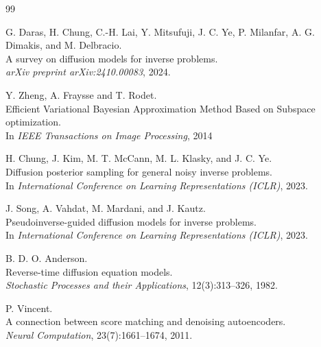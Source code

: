 \documentclass[12pt]{article}
\begin{document}
\newpage

\begin{thebibliography}{99}

G. Daras, H. Chung, C.-H. Lai, Y. Mitsufuji, J. C. Ye, P. Milanfar, A. G. Dimakis, and M. Delbracio.\\
\newblock A survey on diffusion models for inverse problems.\\
\newblock \textit{arXiv preprint arXiv:2410.00083}, 2024.

Y. Zheng, A. Fraysse and T. Rodet.\\
\newblock Efficient Variational Bayesian Approximation Method
Based on Subspace optimization.\\
\newblock In \textit{IEEE Transactions on Image Processing}, 2014

H. Chung, J. Kim, M. T. McCann, M. L. Klasky, and J. C. Ye.\\
\newblock Diffusion posterior sampling for general noisy inverse problems.\\
\newblock In \textit{International Conference on Learning Representations (ICLR)}, 2023.



J. Song, A. Vahdat, M. Mardani, and J. Kautz.\\
\newblock Pseudoinverse-guided diffusion models for inverse problems.\\
\newblock In \textit{International Conference on Learning Representations (ICLR)}, 2023.

B. D. O. Anderson.\\
\newblock Reverse-time diffusion equation models.\\
\newblock \textit{Stochastic Processes and their Applications}, 12(3):313--326, 1982.

P. Vincent.\\
\newblock A connection between score matching and denoising autoencoders.\\
\newblock \textit{Neural Computation}, 23(7):1661--1674, 2011.

\end{thebibliography}
\end{document}

